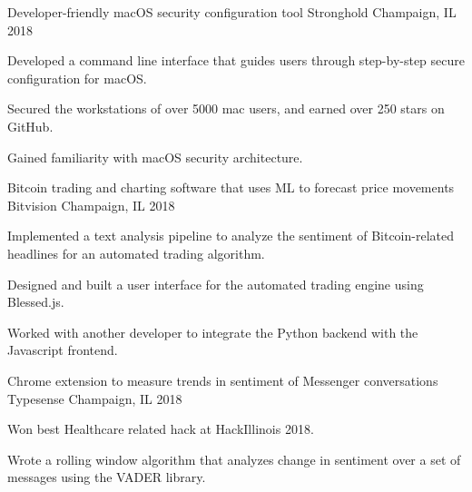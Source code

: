 

\begin{cventries}
\cventry
{Developer-friendly macOS security configuration tool} %
{Stronghold} %
{Champaign, IL} %
{2018} %
{
	\begin{cvitems} %
		\item {Developed a command line interface that guides users through step-by-step secure configuration for macOS.}
		\item {Secured the workstations of over 5000 mac users, and earned over 250 stars on GitHub.}
		\item{Gained familiarity with macOS security architecture.} 
	\end{cvitems}
}
\cventry
{Bitcoin trading and charting software that uses ML to forecast price movements} %
{Bitvision} %
{Champaign, IL} %
{2018} %
{
	\begin{cvitems} %
		\item {Implemented a text analysis pipeline to analyze the sentiment of Bitcoin-related headlines for an automated trading algorithm.}
		\item {Designed and built a user interface for the automated trading engine using Blessed.js.}
		\item {Worked with another developer to integrate the Python backend with the Javascript frontend.}
	\end{cvitems}
}

\cventry
{Chrome extension to measure trends in sentiment of Messenger conversations} %
{Typesense} %
{Champaign, IL} %
{2018} %
{
	\begin{cvitems} %
		\item {Won best Healthcare related hack at HackIllinois 2018.}
		\item {Wrote a rolling window algorithm that analyzes change in sentiment over a set of messages using the VADER library.}
	\end{cvitems}
}


\end{cventries}

